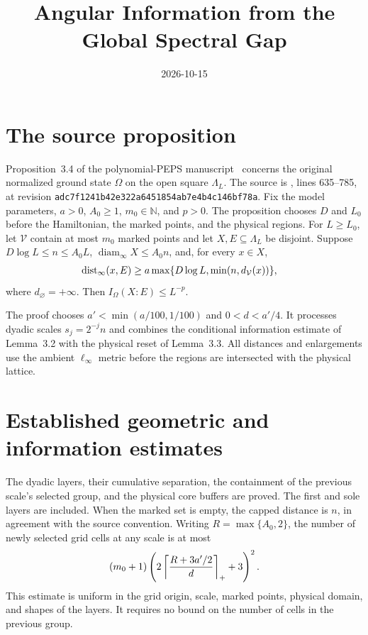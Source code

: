 \documentclass{article}
\title{Angular Information from the Global Spectral Gap}
\author{}
\date{2026-10-15}
\begin{document}
\maketitle
{}

\section{The source proposition}

Proposition~3.4 of the polynomial-PEPS manuscript~\cite{OpenAI2026PolynomialPEPS}
concerns the original normalized ground state $\Omega$ on the open square
$\Lambda_L$. The source is , lines 635--785, at
revision \nolinkurl{adc7f1241b42e322a6451854ab7e4b4c146bf78a}.
Fix the model parameters, $a>0$, $A_0\ge1$, $m_0\in\mathbb N$, and $p>0$.
The proposition chooses $D$ and $L_0$ before the Hamiltonian, the marked
points, and the physical regions. For $L\ge L_0$, let $\mathcal V$ contain
at most $m_0$ marked points and let $X,E\subseteq\Lambda_L$ be disjoint.
Suppose $D\log L\le n\le A_0L$, $\operatorname{diam}_\infty X\le A_0n$, and, for every $x\in X$,
\begin{align}
    \operatorname{dist}_\infty(x,E)
     & \ge a\max\{D\log L,\min(n,d_{\mathcal V}(x))\}
    ,
    \notag
\end{align}
where $d_{\varnothing}=+\infty$. Then $I_\Omega(X:E)\le L^{-p}$.

The proof chooses $a'<\min(a/100,1/100)$ and $0<d<a'/4$.
It processes dyadic scales $s_j=2^{-j}n$ and combines the conditional
information estimate of Lemma~3.2 with the physical reset of Lemma~3.3.
All distances and enlargements use the ambient $\ell_\infty$ metric
before the regions are intersected with the physical lattice.

\section{Established geometric and information estimates}

The dyadic layers, their cumulative separation, the containment of the
previous scale's selected group, and the physical core buffers are proved.
The first and sole layers are included. When the marked set is empty, the
capped distance is $n$, in agreement with the source convention.
Writing $R=\max\{A_0,2\}$, the number of newly selected grid cells at any
scale is at most
\begin{align}
    (m_0+1)\left(2\left\lceil\frac{R+3a'/2}{d}\right\rceil_{+}+3\right)^2.
    \notag
\end{align}
This estimate is uniform in the grid origin, scale, marked points,
physical domain, and shapes of the layers. It requires no bound on the
number of cells in the previous group.
\end{document}
